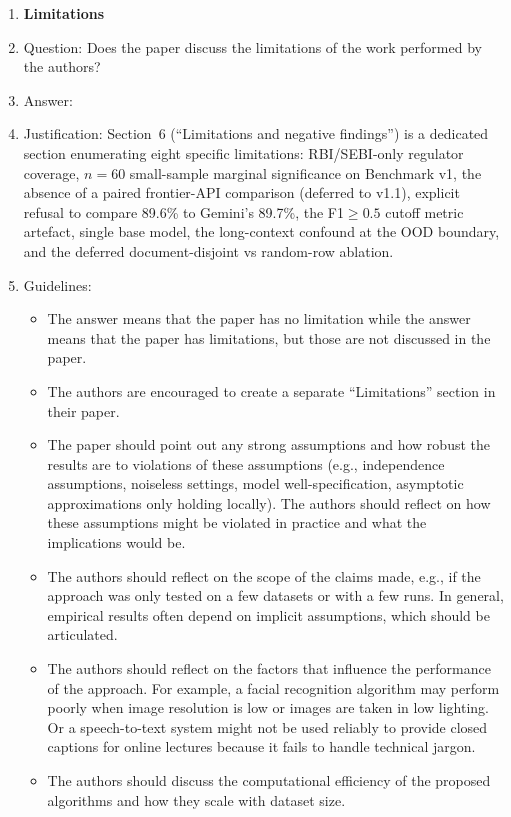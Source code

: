 \begin{enumerate}
\item {\bf Limitations}
    \item[] Question: Does the paper discuss the limitations of the work performed by the authors?
    \item[] Answer: \answerYes{}
    \item[] Justification: Section~6 (``Limitations and negative findings'') is a dedicated section enumerating eight specific limitations: RBI/SEBI-only regulator coverage, $n{=}60$ small-sample marginal significance on Benchmark v1, the absence of a paired frontier-API comparison (deferred to v1.1), explicit refusal to compare 89.6\% to Gemini's 89.7\%, the F1$\geq0.5$ cutoff metric artefact, single base model, the long-context confound at the OOD boundary, and the deferred document-disjoint vs random-row ablation.
    \item[] Guidelines:
    \begin{itemize}
        \item The answer \answerNA{} means that the paper has no limitation while the answer \answerNo{} means that the paper has limitations, but those are not discussed in the paper.
        \item The authors are encouraged to create a separate ``Limitations'' section in their paper.
        \item The paper should point out any strong assumptions and how robust the results are to violations of these assumptions (e.g., independence assumptions, noiseless settings, model well-specification, asymptotic approximations only holding locally). The authors should reflect on how these assumptions might be violated in practice and what the implications would be.
        \item The authors should reflect on the scope of the claims made, e.g., if the approach was only tested on a few datasets or with a few runs. In general, empirical results often depend on implicit assumptions, which should be articulated.
        \item The authors should reflect on the factors that influence the performance of the approach. For example, a facial recognition algorithm may perform poorly when image resolution is low or images are taken in low lighting. Or a speech-to-text system might not be used reliably to provide closed captions for online lectures because it fails to handle technical jargon.
        \item The authors should discuss the computational efficiency of the proposed algorithms and how they scale with dataset size.

\end{itemize}
\end{enumerate}
